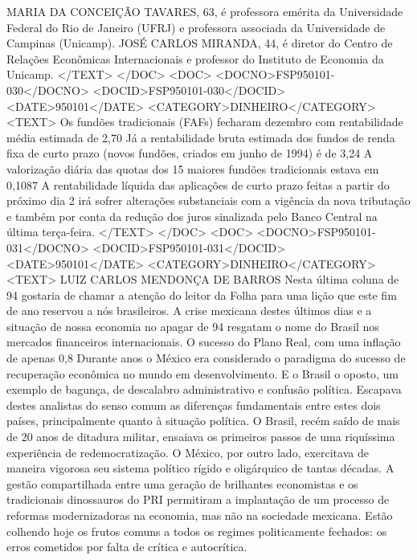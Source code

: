 MARIA DA CONCEIÇÃO TAVARES, 63, é professora emérita da Universidade Federal do Rio de Janeiro (UFRJ) e professora associada da Universidade de Campinas (Unicamp).
JOSÉ CARLOS MIRANDA, 44, é diretor do Centro de Relações Econômicas Internacionais e professor do Instituto de Economia da Unicamp.
</TEXT>
</DOC>
<DOC>
<DOCNO>FSP950101-030</DOCNO>
<DOCID>FSP950101-030</DOCID>
<DATE>950101</DATE>
<CATEGORY>DINHEIRO</CATEGORY>
<TEXT>
Os fundões tradicionais (FAFs) fecharam dezembro com rentabilidade média estimada de 2,70%
Já a rentabilidade bruta estimada dos fundos de renda fixa de curto prazo (novos fundões, criados em junho de 1994) é de 3,24%
A valorização diária das quotas dos 15 maiores fundões tradicionais estava em 0,1087%
A rentabilidade líquida das aplicações de curto prazo feitas a partir do próximo dia 2 irá sofrer alterações substanciais com a vigência da nova tributação e também por conta da redução dos juros sinalizada pelo Banco Central na última terça-feira.
</TEXT>
</DOC>
<DOC>
<DOCNO>FSP950101-031</DOCNO>
<DOCID>FSP950101-031</DOCID>
<DATE>950101</DATE>
<CATEGORY>DINHEIRO</CATEGORY>
<TEXT>
LUIZ CARLOS MENDONÇA DE BARROS 
Nesta última coluna de 94 gostaria de chamar a atenção do leitor da Folha para uma lição que este fim de ano reservou a nós brasileiros. A crise mexicana destes últimos dias e a situação de nossa economia no apagar de 94 resgatam o nome do Brasil nos mercados financeiros internacionais. O sucesso do Plano Real, com uma inflação de apenas 0,8%
Durante anos o México era considerado o paradigma do sucesso de recuperação econômica no mundo em desenvolvimento. E o Brasil o oposto, um exemplo de bagunça, de descalabro administrativo e confusão política. Escapava destes analistas do senso comum as diferenças fundamentais entre estes dois países, principalmente quanto à situação política.
O Brasil, recém saído de mais de 20 anos de ditadura militar, ensaiava os primeiros passos de uma riquíssima experiência de redemocratização. O México, por outro lado, exercitava de maneira vigorosa seu sistema político rígido e oligárquico de tantas décadas. A gestão compartilhada entre uma geração de brilhantes economistas e os tradicionais dinossauros do PRI permitiram a implantação de um processo de reformas modernizadoras na economia, mas não na sociedade mexicana. Estão colhendo hoje os frutos comuns a todos os regimes politicamente fechados: os erros cometidos por falta de crítica e autocrítica.
